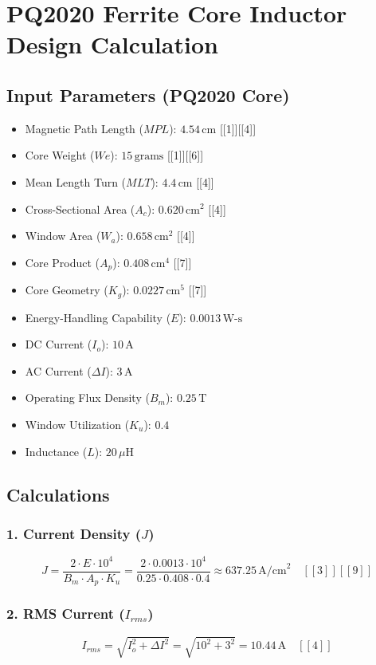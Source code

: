 \documentclass{article}
\begin{document}
	
	\section*{PQ2020 Ferrite Core Inductor Design Calculation}
	
	\subsection*{Input Parameters (PQ2020 Core)}
	\begin{itemize}
		\item Magnetic Path Length (\(MPL\)): \(4.54 \, \text{cm}\) [[1]][[4]]
		\item Core Weight (\(We\)): \(15 \, \text{grams}\) [[1]][[6]]
		\item Mean Length Turn (\(MLT\)): \(4.4 \, \text{cm}\) [[4]]
		\item Cross-Sectional Area (\(A_c\)): \(0.620 \, \text{cm}^2\) [[4]]
		\item Window Area (\(W_a\)): \(0.658 \, \text{cm}^2\) [[4]]
		\item Core Product (\(A_p\)): \(0.408 \, \text{cm}^4\) [[7]]
		\item Core Geometry (\(K_g\)): \(0.0227 \, \text{cm}^5\) [[7]]
		\item Energy-Handling Capability (\(E\)): \(0.0013 \, \text{W-s}\)
		\item DC Current (\(I_o\)): \(10 \, \text{A}\)
		\item AC Current (\(\Delta I\)): \(3 \, \text{A}\)
		\item Operating Flux Density (\(B_m\)): \(0.25 \, \text{T}\)
		\item Window Utilization (\(K_u\)): \(0.4\)
		\item Inductance (\(L\)): \(20 \, \mu\text{H}\)
	\end{itemize}
	
	\subsection*{Calculations}
	
	\subsubsection*{1. Current Density (\(J\))}
	\[
	J = \frac{2 \cdot E \cdot 10^4}{B_m \cdot A_p \cdot K_u} = \frac{2 \cdot 0.0013 \cdot 10^4}{0.25 \cdot 0.408 \cdot 0.4} \approx \boxed{637.25 \, \text{A/cm}^2} \quad [[3]][[9]]
	\]
	
	\subsubsection*{2. RMS Current (\(I_{rms}\))}
	\[
	I_{rms} = \sqrt{I_o^2 + \Delta I^2} = \sqrt{10^2 + 3^2} = \boxed{10.44 \, \text{A}} \quad [[4]]
	\]
	
\end{document}
